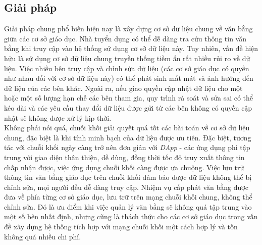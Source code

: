 \subsection{Giải pháp}

Giải pháp chung phổ biến hiện nay là xây dựng cơ sở dữ liệu chung về văn bằng giữa các cơ sở giáo dục. Nhà tuyển dụng có thể dễ dàng tra cứu thông tin văn bằng khi truy cập vào hệ thống sử dụng cơ sở dữ liệu này. Tuy nhiên, vấn đề hiện hữu là sử dụng cơ sở dữ liệu chung truyền thống tiềm ẩn rất nhiều rủi ro về dữ liệu. Việc nhiều bên truy cập và chỉnh sửa dữ liệu (các cơ sở giáo dục có quyền như nhau đối với cơ sở dữ liệu này) có thể phát sinh mất mát và ảnh hưởng đến dữ liệu của các bên khác. Ngoài ra, nếu giao quyền cập nhật dữ liệu cho một hoặc một số lượng hạn chế các bên tham gia, quy trình rà soát và sửa sai có thể kéo dài và các yêu cầu thay đổi dữ liệu được gửi từ các bên không có quyền cập nhật sẽ không được xử lý kịp thời.\\

Không phải nói quá, chuỗi khối giải quyết quá tốt các bài toán về cơ sở dữ liệu chung, đặc biệt là khi tính minh bạch của dữ liệu được ưu tiên. Đặc biệt, tương tác với chuỗi khối ngày càng trở nên đơn giản với \textit{DApp} - các ứng dụng phi tập trung với giao diện thân thiện, dễ dùng, đồng thời tốc độ truy xuất thông tin chấp nhận được, việc ứng dụng chuỗi khối càng được ưa chuộng. Việc lưu trữ thông tin văn bằng giáo dục trên chuỗi khối đảm bảo được dữ liệu không thể bị chỉnh sửa, mọi người đều dễ dàng truy cập. Nhiệm vụ cấp phát văn bằng được đưa về phía từng cơ sở giáo dục, lưu trữ trên mạng chuỗi khối chung, không thể chỉnh sửa. Đó là ưu điểm khi việc quản lý văn bằng sẽ không quá tập trung vào một số bên nhất định, nhưng cũng là thách thức cho các cơ sở giáo dục trong vấn đề xây dựng hệ thống tích hợp với mạng chuỗi khối một cách hợp lý và tốn không quá nhiều chi phí.